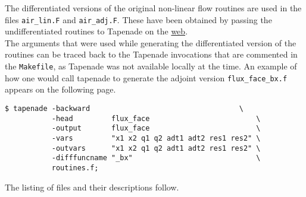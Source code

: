 \noindent The differentiated versions of the original non-linear flow routines are used in the files \texttt{air\_lin.F} and \texttt{air\_adj.F}. These have been obtained by passing the undifferentiated routines to Tapenade on the \href{http://www-tapenade.inria.fr:8080/tapenade/index.jsp}{web}. \\

\noindent The arguments that were used while generating the differentiated version of the routines can be traced back to the Tapenade invocations that are commented in the \texttt{Makefile}, as Tapenade was not available locally at the time. An example of how one would call tapenade to generate the adjoint version \texttt{flux\_face\_bx.f} appears on the following page. 
\clearpage
\begin{lstlisting}[style=BashInputStyle]
$ tapenade -backward                                   \
		   -head         flux_face                         \
		   -output       flux_face                         \
		   -vars         "x1 x2 q1 q2 adt1 adt2 res1 res2" \
		   -outvars      "x1 x2 q1 q2 adt1 adt2 res1 res2" \
		   -difffuncname "_bx"                             \
		   routines.f;
\end{lstlisting}
\noindent The listing of files and their descriptions follow.\\
